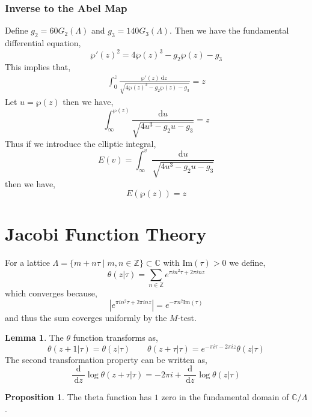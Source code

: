 \documentclass[12pt]{extarticle}
\newcommand{\Z}{\mathbb{Z}}
\newcommand{\C}{\mathbb{C}}
\renewcommand{\Im}[1]{\mathrm{Im}(#1)}
\renewcommand{\d}[1]{\: \mathrm{d}#1 \:}
\newcommand{\deriv}[2]{\frac{\d{#1}}{\d{#2}}}
\theoremstyle{definition}
\newtheorem{lemma}[theorem]{Lemma}
\newtheorem{proposition}[theorem]{Proposition}
\newenvironment{definition}[1][Definition:]{\begin{trivlist}
\item[\hskip \labelsep {\bfseries #1}]}{\end{trivlist}}
\begin{document}
\subsubsection{Inverse to the Abel Map} 

Define $g_2 = 60 G_2(\Lambda)$ and $g_3 = 140 G_3(\Lambda)$. Then we have the fundamental differential equation,
\[ \wp'(z)^2 = 4 \wp(z)^3 - g_2 \wp(z) - g_3 \] 
This implies that,
\begin{align*}
\int_{0}^{z} \frac{\wp'(z) \d{z}}{\sqrt{4 \wp(z)^3 - g_2 \wp(z) - g_3}} = z 
\end{align*}
Let $u = \wp(z)$ then we have,
\[ \int_{\infty}^{\wp(z)} \frac{\d{u}}{\sqrt{4 u^3 - g_2 u - g_3}} = z\]
Thus if we introduce the elliptic integral,
\[ E(v) = \int_{\infty}^v \frac{\d{u}}{\sqrt{4 u^3 - g_2 u - g_3}} \]
then we have,
\[ E(\wp(z)) = z \]
 
\section{Jacobi Function Theory}

\begin{definition}
For a lattice $\Lambda = \{ m + n \tau \mid m,n \in \Z \} \subset \C$ with $\Im{\tau} > 0$ we define,
\[ 
\theta(z | \tau) = \sum_{n \in \Z} e^{\pi i n^2 \tau + 2 \pi i n z} \]
which converges because,
\[ \left| e^{\pi i n^2 \tau + 2 \pi i n z} \right| = e^{- \pi n^2 \Im{\tau}} \]
and thus the sum coverges uniformly by the $M$-test. 
\end{definition}

\begin{lemma}
The $\theta$ function transforms as,
\[ \theta(z + 1 | \tau) = \theta(z | \tau) \quad \quad \theta(z + \tau | \tau) = e^{- \pi i \tau - 2 \pi i z} \theta(z | \tau) \]
The second transformation property can be written as,
\[ \deriv{}{z} \log{\theta(z + \tau | \tau)} = - 2 \pi i + \deriv{}{z} \log{\theta(z | \tau)} \]
\end{lemma}

\begin{proposition}
The theta function has $1$ zero in the fundamental domain of $\C / \Lambda$. 
\end{proposition}
\end{document}
